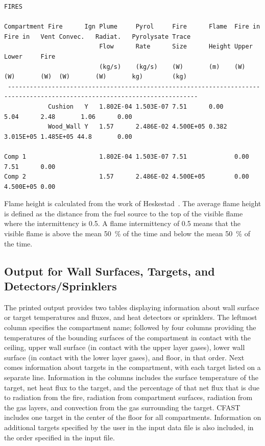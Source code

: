 \begin{lstlisting}[basicstyle=\tiny]
FIRES

Compartment Fire      Ign Plume     Pyrol     Fire      Flame  Fire in Fire in   Vent Convec.   Radiat.   Pyrolysate Trace
                          Flow      Rate      Size      Height Upper   Lower     Fire
                          (kg/s)    (kg/s)    (W)       (m)    (W)     (W)       (W)  (W)       (W)       kg)        (kg)
 --------------------------------------------------------------------------------------------------------------------------
            Cushion   Y   1.802E-04 1.503E-07 7.51      0.00                          5.04      2.48       1.06      0.00
            Wood_Wall Y   1.57      2.486E-02 4.500E+05 0.382                         3.015E+05 1.485E+05 44.8       0.00

Comp 1                    1.802E-04 1.503E-07 7.51             0.00    7.51      0.00
Comp 2                    1.57      2.486E-02 4.500E+05        0.00    4.500E+05 0.00
\end{lstlisting}
Flame height is calculated from the work of Heskestad~\cite{Heskestad:2002}. The average flame height is defined as the distance from the fuel source to the top of the visible flame where the intermittency is 0.5.  A flame intermittency of 0.5 means that the visible flame is above the mean 50~\% of the time and below the mean 50~\% of the time.

\subsection{Output for Wall Surfaces, Targets, and Detectors/Sprinklers}

The printed output provides two tables displaying information about wall surface or target temperatures and fluxes, and heat detectors or sprinklers. The leftmost column specifies the compartment name; followed by four columns providing the temperatures of the bounding surfaces of the compartment in contact with the ceiling, upper wall surface (in contact with the upper layer gases), lower wall surface (in contact with the lower layer gases), and floor, in that order. Next comes information about targets in the compartment, with each target listed on a separate line.  Information in the columns includes the surface temperature of the target, net heat flux to the target, and the percentage of that net flux that is due to radiation from the fire, radiation from compartment surfaces, radiation from the gas layers, and convection from the gas surrounding the target.  CFAST includes one target in the center of the floor for all compartments. Information on additional targets specified by the user in the input data file is also included, in the order specified in the input file.


